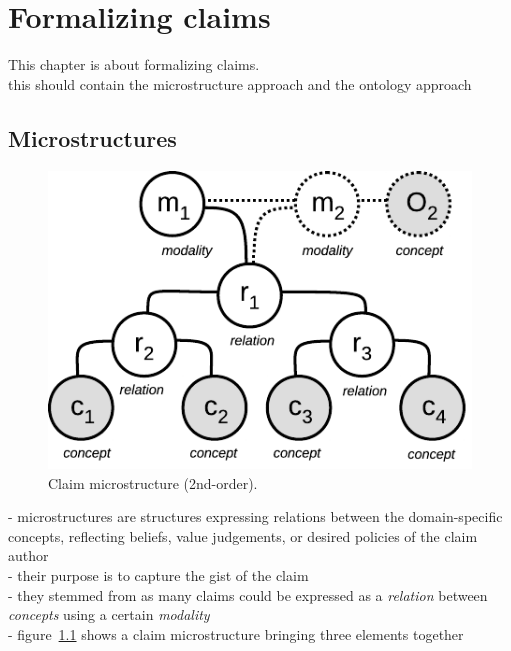 \chapter{Formalizing claims}

This chapter is about formalizing claims. \\
this should contain the microstructure approach and the ontology approach \\

\section{Microstructures}

\begin{figure}
	\begin{center}
      \includegraphics[scale=1]{microstructure.pdf}
      \end{center}
      \caption{Claim microstructure (2nd-order).}
  \label{fig:structures_flowchart}
\end{figure}

- microstructures are structures expressing relations between the domain-specific
concepts, reflecting beliefs, value judgements, or desired policies of the claim
author \\
- their purpose is to capture the gist of the claim \\
- they stemmed from as many claims could be expressed as a \emph{relation} between \emph{concepts} using 
a certain \emph{modality} \\
- figure~\ref{fig:structures_flowchart} shows a claim microstructure bringing three elements 
together \\

